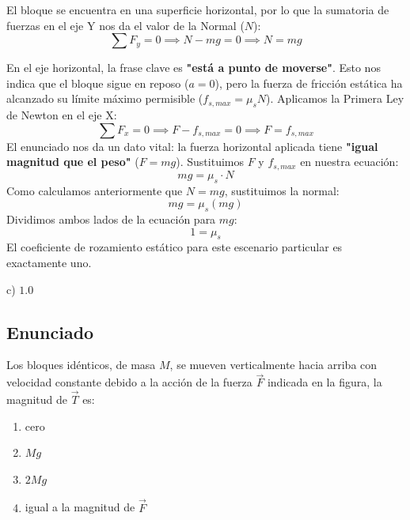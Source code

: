 \documentclass[12pt, a4paper]{article}
\begin{document}
El bloque se encuentra en una superficie horizontal, por lo que la sumatoria de fuerzas en el eje Y nos da el valor de la Normal ($N$):
$$ \sum F_y = 0 \implies N - mg = 0 \implies N = mg $$

En el eje horizontal, la frase clave es \textbf{"está a punto de moverse"}. Esto nos indica que el bloque sigue en reposo ($a = 0$), pero la fuerza de fricción estática ha alcanzado su límite máximo permisible ($f_{s,max} = \mu_s N$).
Aplicamos la Primera Ley de Newton en el eje X:
$$ \sum F_x = 0 \implies F - f_{s,max} = 0 \implies F = f_{s,max} $$
El enunciado nos da un dato vital: la fuerza horizontal aplicada tiene \textbf{"igual magnitud que el peso"} ($F = mg$).
Sustituimos $F$ y $f_{s,max}$ en nuestra ecuación:
$$ mg = \mu_s \cdot N $$
Como calculamos anteriormente que $N = mg$, sustituimos la normal:
$$ mg = \mu_s (mg) $$
Dividimos ambos lados de la ecuación para $mg$:
$$ 1 = \mu_s $$
El coeficiente de rozamiento estático para este escenario particular es exactamente uno.

\begin{tcolorbox}[colback=green!5!white, colframe=green!50!black, title=Respuesta Final]
\centering \Large c) $1.0$
\end{tcolorbox}

\newpage

\subsection*{Enunciado}
Los bloques idénticos, de masa $M$, se mueven verticalmente hacia arriba con velocidad constante debido a la acción de la fuerza $\vec{F}$ indicada en la figura, la magnitud de $\vec{T}$ es:

\begin{center}
\end{center}

\begin{enumerate}[label=\alph*)]
    \item cero
    \item $Mg$
    \item $2Mg$
    \item igual a la magnitud de $\vec{F}$
\end{enumerate}
\end{document}
